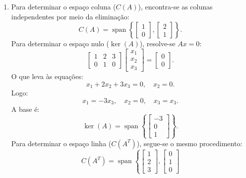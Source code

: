 \begin{resolution}
  \begin{enumerate}[label=\alph*)]
    \item Para determinar o espaço coluna (\( C(A) \)), encontra-se as colunas independentes por meio da eliminação:
          \[
            C(A) = \operatorname{span}\left\{
            \begin{bmatrix} 1 \\ 0 \end{bmatrix},
            \begin{bmatrix} 2 \\ 1 \end{bmatrix}
            \right\}.
          \]
          Para determinar o espaço nulo (\( \operatorname{ker}(A) \)), resolve-se \( A x = 0 \):
          \[
            \begin{bmatrix}
              1 & 2 & 3 \\
              0 & 1 & 0
            \end{bmatrix}
            \begin{bmatrix}
              x_1 \\ x_2 \\ x_3
            \end{bmatrix} =
            \begin{bmatrix}
              0 \\ 0
            \end{bmatrix}.
          \]
          O que leva às equações:
          \[
            x_1 + 2x_2 + 3x_3 = 0, \quad x_2 = 0.
          \]
          Logo:
          \[
            x_1 = -3x_3, \quad x_2 = 0, \quad x_3 = x_3.
          \]
          A base é:
          \[
            \operatorname{ker}(A) = \operatorname{span}\left\{
            \begin{bmatrix}
              -3 \\ 0 \\ 1
            \end{bmatrix}
            \right\}.
          \]
          Para determinar o espaço linha (\( C(A^T) \)), segue-se o mesmo procedimento:
          \[
            C(A^T) = \operatorname{span}\left\{
            \begin{bmatrix} 1 \\ 2 \\ 3 \end{bmatrix},
            \begin{bmatrix} 0 \\ 1 \\ 0 \end{bmatrix}
\]
\end{enumerate}
\end{resolution}

